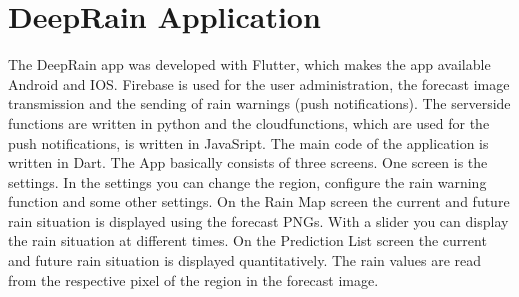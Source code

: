 \documentclass[oneside]{htwg-report}
\begin{document}
\section*{DeepRain Application}
    \begin{sloppypar}
        The DeepRain app was developed with Flutter, which makes the app available Android and IOS. 
        Firebase is used for the user administration, the forecast image transmission and the sending of rain warnings (push notifications). 
        The serverside functions are written in python and the cloudfunctions, which are used for the push notifications, is written in JavaSript. 
        The main code of the application is written in Dart.  
        The App basically consists of three screens. One screen is the settings. 
        In the settings you can change the region, configure the rain warning function and some other settings.
        On the Rain Map screen the current and future rain situation is displayed using the forecast PNGs. With a slider you can display the rain situation at different times.
        On the Prediction List screen the current and future rain situation is displayed quantitatively. The rain values are read from the respective pixel of the region in the forecast image.   
    \end{sloppypar}
\end{document}
